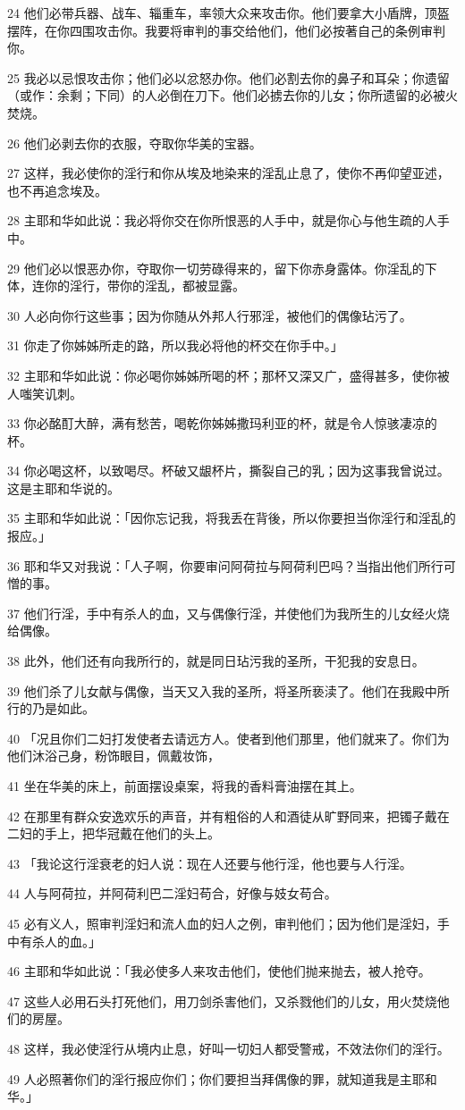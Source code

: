 \par 24 他们必带兵器、战车、辎重车，率领大众来攻击你。他们要拿大小盾牌，顶盔摆阵，在你四围攻击你。我要将审判的事交给他们，他们必按著自己的条例审判你。
\par 25 我必以忌恨攻击你；他们必以忿怒办你。他们必割去你的鼻子和耳朵；你遗留（或作：余剩；下同）的人必倒在刀下。他们必掳去你的儿女；你所遗留的必被火焚烧。
\par 26 他们必剥去你的衣服，夺取你华美的宝器。
\par 27 这样，我必使你的淫行和你从埃及地染来的淫乱止息了，使你不再仰望亚述，也不再追念埃及。
\par 28 主耶和华如此说：我必将你交在你所恨恶的人手中，就是你心与他生疏的人手中。
\par 29 他们必以恨恶办你，夺取你一切劳碌得来的，留下你赤身露体。你淫乱的下体，连你的淫行，带你的淫乱，都被显露。
\par 30 人必向你行这些事；因为你随从外邦人行邪淫，被他们的偶像玷污了。
\par 31 你走了你姊姊所走的路，所以我必将他的杯交在你手中。」
\par 32 主耶和华如此说：你必喝你姊姊所喝的杯；那杯又深又广，盛得甚多，使你被人嗤笑讥刺。
\par 33 你必酩酊大醉，满有愁苦，喝乾你姊姊撒玛利亚的杯，就是令人惊骇凄凉的杯。
\par 34 你必喝这杯，以致喝尽。杯破又龈杯片，撕裂自己的乳；因为这事我曾说过。这是主耶和华说的。
\par 35 主耶和华如此说：「因你忘记我，将我丢在背後，所以你要担当你淫行和淫乱的报应。」
\par 36 耶和华又对我说：「人子啊，你要审问阿荷拉与阿荷利巴吗？当指出他们所行可憎的事。
\par 37 他们行淫，手中有杀人的血，又与偶像行淫，并使他们为我所生的儿女经火烧给偶像。
\par 38 此外，他们还有向我所行的，就是同日玷污我的圣所，干犯我的安息日。
\par 39 他们杀了儿女献与偶像，当天又入我的圣所，将圣所亵渎了。他们在我殿中所行的乃是如此。
\par 40 「况且你们二妇打发使者去请远方人。使者到他们那里，他们就来了。你们为他们沐浴己身，粉饰眼目，佩戴妆饰，
\par 41 坐在华美的床上，前面摆设桌案，将我的香料膏油摆在其上。
\par 42 在那里有群众安逸欢乐的声音，并有粗俗的人和酒徒从旷野同来，把镯子戴在二妇的手上，把华冠戴在他们的头上。
\par 43 「我论这行淫衰老的妇人说：现在人还要与他行淫，他也要与人行淫。
\par 44 人与阿荷拉，并阿荷利巴二淫妇苟合，好像与妓女苟合。
\par 45 必有义人，照审判淫妇和流人血的妇人之例，审判他们；因为他们是淫妇，手中有杀人的血。」
\par 46 主耶和华如此说：「我必使多人来攻击他们，使他们抛来抛去，被人抢夺。
\par 47 这些人必用石头打死他们，用刀剑杀害他们，又杀戮他们的儿女，用火焚烧他们的房屋。
\par 48 这样，我必使淫行从境内止息，好叫一切妇人都受警戒，不效法你们的淫行。
\par 49 人必照著你们的淫行报应你们；你们要担当拜偶像的罪，就知道我是主耶和华。」

